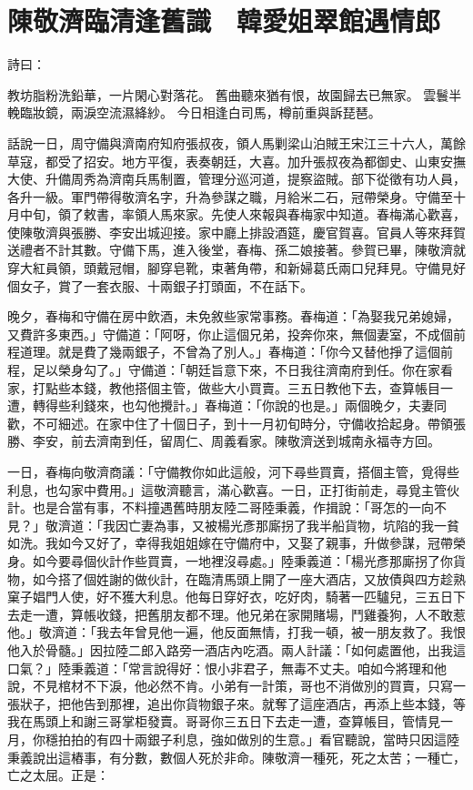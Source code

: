 %

\chapter{陳敬濟臨清逢舊識　韓愛姐翠館遇情郎}

詩曰：

教坊脂粉洗鉛華，一片閑心對落花。
舊曲聽來猶有恨，故園歸去已無家。
雲鬟半輓臨妝鏡，兩淚空流濕絳紗。
今日相逢白司馬，樽前重與訴琵琶。

話說一日，周守備與濟南府知府張叔夜，領人馬剿梁山泊賊王宋江三十六人，萬餘草寇，都受了招安。地方平復，表奏朝廷，大喜。加升張叔夜為都御史、山東安撫大使、升備周秀為濟南兵馬制置，管理分巡河道，提察盜賊。部下從徵有功人員，各升一級。軍門帶得敬濟名字，升為參謀之職，月給米二石，冠帶榮身。守備至十月中旬，領了敕書，率領人馬來家。先使人來報與春梅家中知道。春梅滿心歡喜，使陳敬濟與張勝、李安出城迎接。家中廳上排設酒筵，慶官賀喜。官員人等來拜賀送禮者不計其數。守備下馬，進入後堂，春梅、孫二娘接著。參賀已畢，陳敬濟就穿大紅員領，頭戴冠帽，腳穿皂靴，束著角帶，和新婦葛氏兩口兒拜見。守備見好個女子，賞了一套衣服、十兩銀子打頭面，不在話下。

晚夕，春梅和守備在房中飲酒，未免敘些家常事務。春梅道：「為娶我兄弟媳婦，又費許多東西。」守備道：「阿呀，你止這個兄弟，投奔你來，無個妻室，不成個前程道理。就是費了幾兩銀子，不曾為了別人。」春梅道：「你今又替他掙了這個前程，足以榮身勾了。」守備道：「朝廷旨意下來，不日我往濟南府到任。你在家看家，打點些本錢，教他搭個主管，做些大小買賣。三五日教他下去，查算帳目一遭，轉得些利錢來，也勾他攪計。」春梅道：「你說的也是。」兩個晚夕，夫妻同歡，不可細述。在家中住了十個日子，到十一月初旬時分，守備收拾起身。帶領張勝、李安，前去濟南到任，留周仁、周義看家。陳敬濟送到城南永福寺方回。

一日，春梅向敬濟商議：「守備教你如此這般，河下尋些買賣，搭個主管，覓得些利息，也勾家中費用。」這敬濟聽言，滿心歡喜。一日，正打街前走，尋覓主管伙計。也是合當有事，不料撞遇舊時朋友陸二哥陸秉義，作揖說：「哥怎的一向不見？」敬濟道：「我因亡妻為事，又被楊光彥那廝拐了我半船貨物，坑陷的我一貧如洗。我如今又好了，幸得我姐姐嫁在守備府中，又娶了親事，升做參謀，冠帶榮身。如今要尋個伙計作些買賣，一地裡沒尋處。」陸秉義道：「楊光彥那廝拐了你貨物，如今搭了個姓謝的做伙計，在臨清馬頭上開了一座大酒店，又放債與四方趁熟窠子娼門人使，好不獲大利息。他每日穿好衣，吃好肉，騎著一匹驢兒，三五日下去走一遭，算帳收錢，把舊朋友都不理。他兄弟在家開賭場，鬥雞養狗，人不敢惹他。」敬濟道：「我去年曾見他一遍，他反面無情，打我一頓，被一朋友救了。我恨他入於骨髓。」因拉陸二郎入路旁一酒店內吃酒。兩人計議：「如何處置他，出我這口氣？」陸秉義道：「常言說得好：恨小非君子，無毒不丈夫。咱如今將理和他說，不見棺材不下淚，他必然不肯。小弟有一計策，哥也不消做別的買賣，只寫一張狀子，把他告到那裡，追出你貨物銀子來。就奪了這座酒店，再添上些本錢，等我在馬頭上和謝三哥掌柜發賣。哥哥你三五日下去走一遭，查算帳目，管情見一月，你穩拍拍的有四十兩銀子利息，強如做別的生意。」看官聽說，當時只因這陸秉義說出這樁事，有分數，數個人死於非命。陳敬濟一種死，死之太苦；一種亡，亡之太屈。正是：

